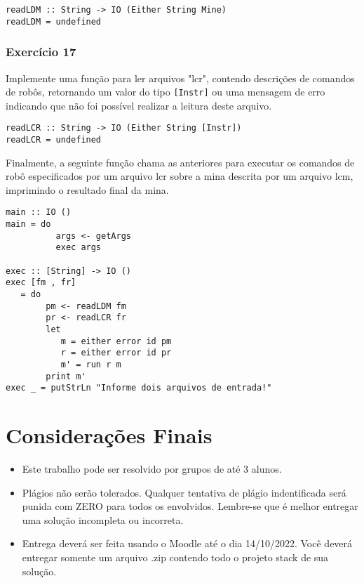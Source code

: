 \documentclass[a4paper]{article}
\begin{document}
\begin{verbatim}
readLDM :: String -> IO (Either String Mine)
readLDM = undefined
\end{verbatim}

\subsubsection{Exercício 17}
\label{sec:org7d80f6d}

Implemente uma função para ler arquivos "lcr", contendo descrições
de comandos de robôs, retornando um valor do tipo \texttt{[Instr]} ou uma mensagem de erro
indicando que não foi possível realizar a leitura deste arquivo.

\begin{verbatim}
readLCR :: String -> IO (Either String [Instr])
readLCR = undefined
\end{verbatim}

Finalmente, a seguinte função chama as anteriores para executar os comandos de robô
especificados por um arquivo lcr sobre a mina descrita por um arquivo lcm, imprimindo
o resultado final da mina.

\begin{verbatim}
main :: IO ()
main = do
          args <- getArgs
          exec args

exec :: [String] -> IO ()
exec [fm , fr]
   = do
        pm <- readLDM fm
        pr <- readLCR fr
        let
           m = either error id pm
           r = either error id pr
           m' = run r m
        print m'
exec _ = putStrLn "Informe dois arquivos de entrada!"
\end{verbatim}

\section{Considerações Finais}
\label{sec:org4cc28b5}

\begin{itemize}
\item Este trabalho pode ser resolvido por grupos de até 3 alunos.

\item Plágios não serão tolerados. Qualquer tentativa de plágio
indentificada será punida com ZERO para todos os envolvidos.
Lembre-se que é melhor entregar uma solução incompleta ou
incorreta.

\item Entrega deverá ser feita usando o Moodle até o dia 14/10/2022. Você
deverá entregar somente um arquivo .zip contendo todo o projeto
stack de sua solução.
\end{itemize}
\end{document}
